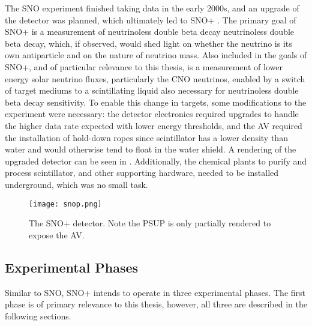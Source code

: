 The SNO experiment finished taking data in the early 2000s, and an upgrade of the detector was planned, which ultimately led to SNO+ \cite{snop}.
The primary goal of SNO+ is a measurement of neutrinoless double beta decay neutrinoless double beta decay, which, if observed, would shed light on whether the neutrino is its own antiparticle and on the nature of neutrino mass.
Also included in the goals of SNO+, and of particular relevance to this thesis, is a measurement of lower energy solar neutrino fluxes, particularly the CNO neutrinos, enabled by a switch of target mediums to a scintillating liquid also necessary for neutrinoless double beta decay sensitivity.
To enable this change in targets, some modifications to the experiment were necessary: the detector electronics required upgrades to handle the higher data rate expected with lower energy thresholds, and the AV required the installation of hold-down ropes since scintillator has a lower density than water and would otherwise tend to float in the water shield.
A rendering of the upgraded detector can be seen in .
Additionally, the chemical plants to purify and process scintillator, and other supporting hardware, needed to be installed underground, which was no small task.

\begin{figure}
\centering
\texttt{[image: snop.png]}
\caption{\label{fig:snop}The SNO+ detector. Note the PSUP is only partially rendered to expose the AV.}
\end{figure}

\subsection{Experimental Phases}
Similar to SNO, SNO+ intends to operate in three experimental phases.
The first phase is of primary relevance to this thesis, however, all three are described in the following sections.

